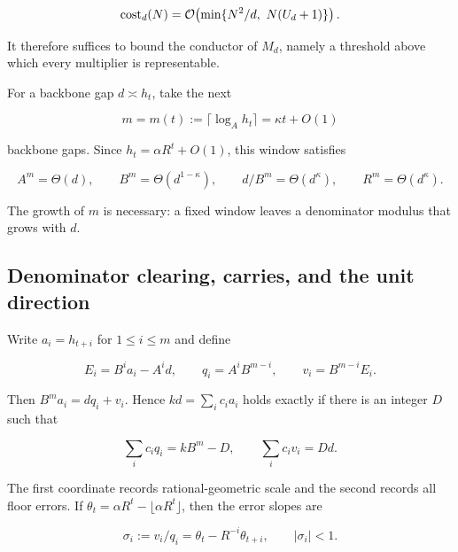 \begin{equation}
  \operatorname{cost}_d(N)=\mathcal{O}\!\left(
    \min\{N^2/d,\ N(U_d+1)\}
  \right).
  \label{eq:main-combined-pass}
\end{equation}

It therefore suffices to bound the conductor of $M_d$, namely a threshold
above which every multiplier is representable.

For a backbone gap $d\asymp h_t$, take the next

\begin{equation}
  m=m(t):=\lceil\log_A h_t\rceil
  =\kappa t+O(1)
  \label{eq:main-window}
\end{equation}

backbone gaps.  Since $h_t=\alpha R^t+O(1)$, this window satisfies

\begin{equation}
  A^m=\Theta(d),\qquad
  B^m=\Theta(d^{1-\kappa}),\qquad
  d/B^m=\Theta(d^\kappa),\qquad
  R^m=\Theta(d^\kappa).
  \label{eq:main-window-scales}
\end{equation}

The growth of $m$ is necessary: a fixed window leaves a denominator modulus
that grows with $d$.

\subsection{Denominator clearing, carries, and the unit direction}

Write $a_i=h_{t+i}$ for $1\le i\le m$ and define

\begin{equation}
  E_i=B^ia_i-A^id,\qquad
  q_i=A^iB^{m-i},\qquad
  v_i=B^{m-i}E_i.
  \label{eq:main-qv}
\end{equation}

Then $B^ma_i=dq_i+v_i$.  Hence
$kd=\sum_i c_i a_i$ holds exactly if there is an integer $D$ such that

\begin{equation}
  \sum_i c_iq_i=kB^m-D,
  \qquad
  \sum_i c_iv_i=Dd.
  \label{eq:main-coupled}
\end{equation}

The first coordinate records rational-geometric scale and the second records
all floor errors.  If
$\theta_t=\alpha R^t-\lfloor\alpha R^t\rfloor$, then the error slopes are

\begin{equation}
  \sigma_i:=v_i/q_i
  =\theta_t-R^{-i}\theta_{t+i},
  \qquad |\sigma_i|<1.
  \label{eq:main-slopes}
\end{equation}

